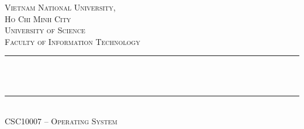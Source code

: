 \thispagestyle{empty}
\begin{titlepage}
	\begin{center}
		\makeatletter
		\newcommand{\HRule}{\rule{\linewidth}{0.4mm}}

		\textsc{\LARGE Vietnam National University,\\Ho Chi Minh City}\\[1.5cm]
		\textsc{\Large University of Science}\\[0.5cm]
		\textsc{\Large Faculty of Information Technology}\\[1.5cm]

		{\HRule}\\[1cm]
		{\huge \bfseries \@title}\\[0.5cm]
		{\HRule}\\[2cm]

		\textsc{\large CSC10007 -- Operating System}\\[0.5cm]

		\vfill\vfill\vfill

		{\large \@author}\\[1.5cm]
		{\large \@date}
		\makeatother
	\end{center}
\end{titlepage}
